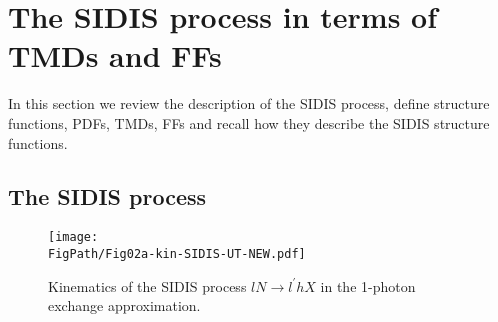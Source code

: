 \documentclass[a4paper,11pt]{article}
\newcommand*{\FigPath}{./figs}%
\begin{document}
\newpage
\section{The SIDIS process in terms of TMDs and FFs}
\label{Sec-2:SIDIS+TMDs+FF}

In this section we review the description of the SIDIS process,
define structure functions, PDFs, TMDs, FFs and recall how they
describe the SIDIS structure functions.


\subsection{The SIDIS process}
\label{Sec-2.1:SIDIS+structure-functions}

\begin{wrapfigure}[9]{RD}{8cm}
\vspace{-7mm}
\centering
	\texttt{[image: \\FigPath/Fig02a-kin-SIDIS-UT-NEW.pdf]}
        \caption{\label{fig-kin-SIDIS}
    	Kinematics of the SIDIS process $lN\to l^\prime h X$
	in the 1-photon exchange approximation.}
\vspace{-5mm}
\end{wrapfigure}
\end{document}
